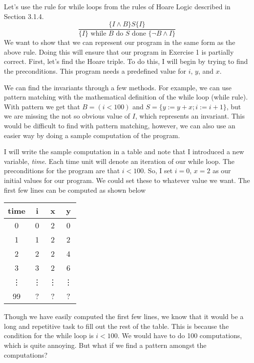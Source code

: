 \documentclass{article}
\begin{document}
Let's use the rule for while loops from the rules of Hoare Logic described in Section 3.1.4. 
$$ \frac{\{I\wedge B\} S \{ I\}}{\{ I\} \text{ while } B \text{ do } S \text{ done } \{ \neg B \wedge I\}}$$
We want to show that we can represent our program in the same form as the above rule. Doing this will ensure that our program in Exercise 1 is partially correct. First, let's find the Hoare triple. To do this, I will begin by trying to find the preconditions. This program needs a predefined value for $i$, $y$, and $x$.

\vspace{\baselineskip}
We can find the invariants through a few methods. For example, we can use pattern matching with the mathematical definition of the while loop (while rule). With pattern we get that $B = (i < 100)$ and $S = \{ y := y + x; i := i + 1 \}$, but we are missing the not so obvious value of $I$, which represents an invariant. This would be difficult to find with pattern matching, however, we can also use an easier way by doing a sample computation of the program.

\vspace{\baselineskip}
I will write the sample computation in a table and note that I introduced a new variable, \textit{time}. Each time unit will denote an iteration of our while loop. The preconditions for the program are that $i < 100$. So, I set $i = 0$, $x = 2$ as our initial values for our program. We could set these to whatever value we want. The first few lines can be computed as shown below

\begin{center}
\begin{tabular}{||c c c c||} 
 \hline
 time & i & x & y \\ [0.5ex] 
 \hline\hline
 0 & 0 & 2 & 0\\ 
 \hline
 1 & 1 & 2 & 2 \\
 \hline
 2 & 2 & 2 & 4 \\
 \hline
 3 & 3 & 2 & 6 \\ 
 \hline
 \vdots & \vdots & \vdots & \vdots \\ 
 \hline
 99 & ? & ? & ? \\ 
 \hline
\end{tabular}
\end{center}
Though we have easily computed the first few lines, we know that it would be a long and repetitive task to fill out the rest of the table. This is because the condition for the while loop is $i < 100$. We would have to do 100 computations, which is quite annoying. But what if we find a pattern amongst the computations?
\end{document}
